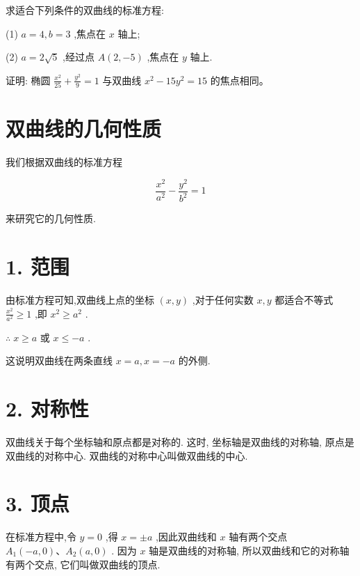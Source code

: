 \documentclass[lang=cn,newtx,10pt,scheme=chinese]{elegantbook}
\begin{document}
\begin{problemset}[练习]

\item 求适合下列条件的双曲线的标准方程:

(1) \(a = 4,b = 3\) ,焦点在 \(x\) 轴上;

(2) \(a = 2\sqrt{5}\) ,经过点 \(A\left( {2, - 5}\right)\) ,焦点在 \(y\) 轴上.

\item 证明: 椭圆 \(\frac{{x}^{2}}{25} + \frac{{y}^{2}}{9} = 1\) 与双曲线 \({x}^{2} - {15}{y}^{2} = {15}\) 的焦点相同。

\end{problemset}

\section{双曲线的几何性质}

我们根据双曲线的标准方程

\[
  \frac{{x}^{2}}{{a}^{2}} - \frac{{y}^{2}}{{b}^{2}} = 1
\]

来研究它的几何性质.

\section*{1. 范围}

由标准方程可知,双曲线上点的坐标 \(\left( {x,y}\right)\) ,对于任何实数 \(x,y\) 都适合不等式 \(\frac{{x}^{2}}{{a}^{2}} \geq 1\) ,即 \({x}^{2} \geq {a}^{2}\) .

\(\therefore \;x \geq a\) 或 \(x \leq - a\) .

这说明双曲线在两条直线 \(x = a,x = - a\) 的外侧.

\section*{2. 对称性}

双曲线关于每个坐标轴和原点都是对称的. 这时, 坐标轴是双曲线的对称轴, 原点是双曲线的对称中心. 双曲线的对称中心叫做双曲线的中心.

\section*{3. 顶点}

在标准方程中,令 \(y = 0\) ,得 \(x = \pm a\) ,因此双曲线和 \(x\) 轴有两个交点 \({A}_{1}\left( {-a,0}\right) \text{、}{A}_{2}\left( {a,0}\right)\) . 因为 \(x\) 轴是双曲线的对称轴, 所以双曲线和它的对称轴有两个交点, 它们叫做双曲线的顶点.
\end{document}
